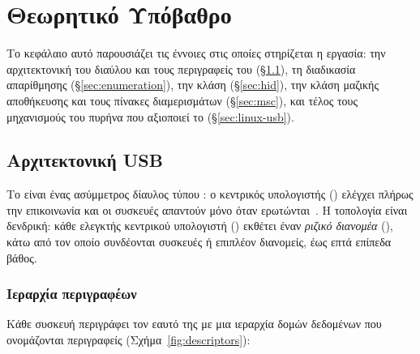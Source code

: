 \chapter{Θεωρητικό Υπόβαθρο}
\label{ch:background}

Το κεφάλαιο αυτό παρουσιάζει τις έννοιες στις οποίες στηρίζεται η εργασία: την
αρχιτεκτονική του διαύλου  και τους περιγραφείς του (§\ref{sec:usb-arch}),
τη διαδικασία απαρίθμησης (§\ref{sec:enumeration}), την κλάση 
(§\ref{sec:hid}), την κλάση μαζικής αποθήκευσης και τους πίνακες διαμερισμάτων
(§\ref{sec:msc}), και τέλος τους μηχανισμούς του πυρήνα  που
αξιοποιεί το \Probolos{} (§\ref{sec:linux-usb}).

\section{Αρχιτεκτονική USB}
\label{sec:usb-arch}

Το  είναι ένας ασύμμετρος δίαυλος τύπου : ο
κεντρικός υπολογιστής () ελέγχει πλήρως την επικοινωνία και οι συσκευές
απαντούν μόνο όταν ερωτώνται~\cite{usb20spec}. Η τοπολογία είναι δενδρική: κάθε
ελεγκτής κεντρικού υπολογιστή () εκθέτει έναν
\emph{ριζικό διανομέα} (), κάτω από τον οποίο συνδέονται συσκευές
ή επιπλέον διανομείς, έως επτά επίπεδα βάθος.

\subsection{Ιεραρχία περιγραφέων}

Κάθε συσκευή  περιγράφει τον εαυτό της με μια ιεραρχία δομών δεδομένων
που ονομάζονται περιγραφείς (Σχήμα~\ref{fig:descriptors}):

